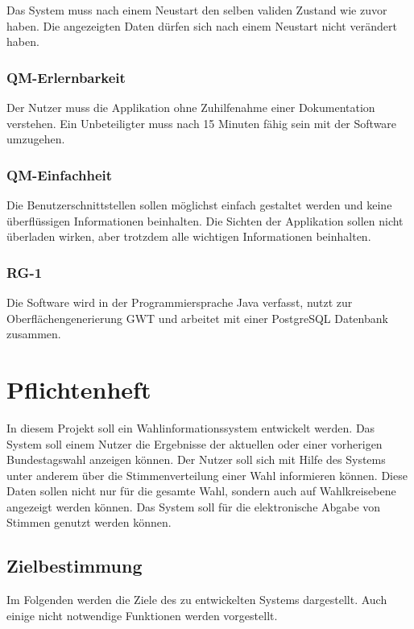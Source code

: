 \documentclass[a4paper]{scrreprt}
\begin{document}
Das System muss nach einem Neustart den selben validen Zustand wie zuvor haben. Die angezeigten Daten dürfen sich nach einem Neustart nicht verändert haben.

\subsection{QM-Erlernbarkeit}

Der Nutzer muss die Applikation ohne Zuhilfenahme einer Dokumentation verstehen. Ein Unbeteiligter muss nach 15 Minuten fähig sein mit der Software umzugehen.

\subsection{QM-Einfachheit}

Die Benutzerschnittstellen sollen möglichst einfach gestaltet werden und keine überflüssigen Informationen beinhalten. Die Sichten der Applikation sollen nicht überladen wirken, aber trotzdem alle wichtigen Informationen beinhalten.

\subsection{RG-1}

Die Software wird in der Programmiersprache Java verfasst, nutzt zur Oberflächengenerierung GWT und arbeitet mit einer PostgreSQL Datenbank zusammen.
 
 

\chapter{Pflichtenheft}

In diesem Projekt soll ein Wahlinformationssystem entwickelt werden. Das System soll einem Nutzer die Ergebnisse der aktuellen oder einer vorherigen Bundestagswahl anzeigen können. Der Nutzer soll sich mit Hilfe des Systems unter anderem über die Stimmenverteilung einer Wahl informieren können. Diese Daten sollen nicht nur für die gesamte Wahl, sondern auch auf Wahlkreisebene angezeigt werden können. Das System soll für die elektronische Abgabe von Stimmen genutzt werden können. 

\section{Zielbestimmung}

Im Folgenden werden die Ziele des zu entwickelten Systems dargestellt. Auch einige nicht notwendige Funktionen werden vorgestellt.
 
\end{document}

